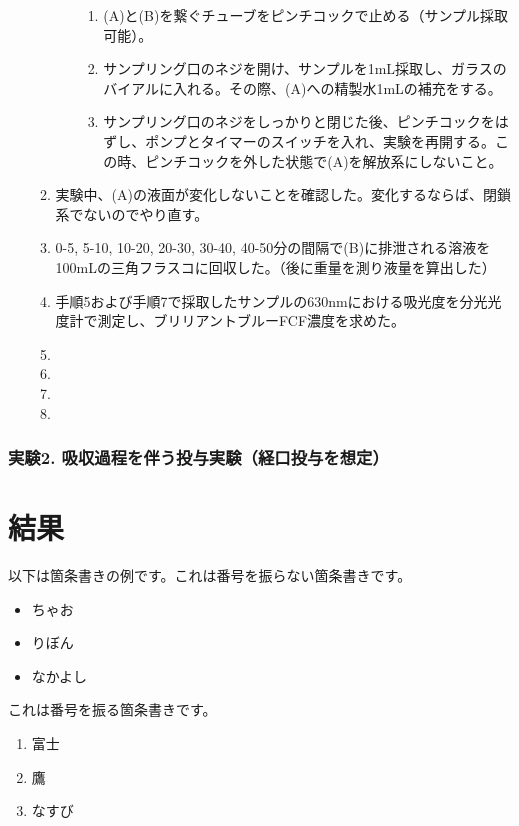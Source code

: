 \documentclass{jsarticle}
\begin{document}
\begin{itemize}
\begin{enumerate}
\begin{itemize}
\begin{enumerate}
                        \item (A)と(B)を繋ぐチューブをピンチコックで止める（サンプル採取可能）。
                        \item サンプリング口のネジを開け、サンプルを1mL採取し、ガラスのバイアルに入れる。その際、(A)への精製水1mLの補充をする。
                        \item サンプリング口のネジをしっかりと閉じた後、ピンチコックをはずし、ポンプとタイマーのスイッチを入れ、実験を再開する。この時、ピンチコックを外した状態で(A)を解放系にしないこと。
                    \end{enumerate}
            \end{itemize}
        \item 実験中、(A)の液面が変化しないことを確認した。変化するならば、閉鎖系でないのでやり直す。 
        \item 0-5, 5-10, 10-20, 20-30, 30-40, 40-50分の間隔で(B)に排泄される溶液を100mLの三角フラスコに回収した。（後に重量を測り液量を算出した）
        \item 手順5および手順7で採取したサンプルの630nmにおける吸光度を分光光度計で測定し、ブリリアントブルーFCF濃度を求めた。
        \item 
        \item 
        \item 
        \item 
    \end{enumerate}
\end{itemize}

\subsubsection{実験2. 吸収過程を伴う投与実験（経口投与を想定）}

\section{結果}

以下は箇条書きの例です。これは番号を振らない箇条書きです。

\begin{itemize}
  \item ちゃお
  \item りぼん
  \item なかよし
\end{itemize}

これは番号を振る箇条書きです。

\begin{enumerate}
  \item 富士
  \item 鷹
  \item なすび
\end{enumerate}
\end{document}
